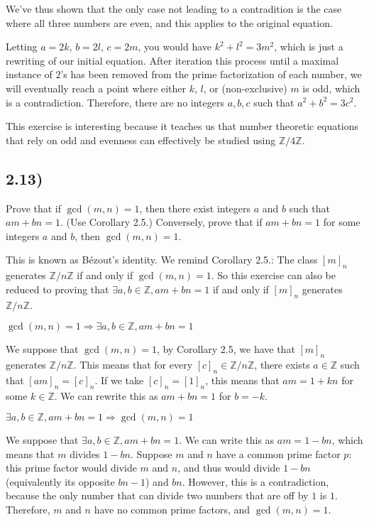 We've thus shown that the only case not leading to a contradition is the case where all three numbers are even, and this applies to the original equation.

Letting $a = 2k$, $b = 2l$, $c = 2m$, you would have $k^2 + l^2 = 3m^2$, which is just a rewriting of our initial equation. After iteration this process until a maximal instance of $2$'s has been removed from the prime factorization of each number, we will eventually reach a point where either $k$, $l$, or (non-exclusive) $m$ is odd, which is a contradiction. Therefore, there are no integers $a, b, c$ such that $a^2 + b^2 = 3c^2$.

This exercise is interesting because it teaches us that number theoretic equations that rely on odd and evenness can effectively be studied using $\mathbb{Z}/4\mathbb{Z}$.


\subsection*{2.13)}

Prove that if $\gcd(m, n) = 1$, then there exist integers $a$ and $b$ such that $am + bn = 1$. (Use Corollary 2.5.) Conversely, prove that if $am + bn = 1$ for some integers $a$ and $b$, then $\gcd(m, n) = 1$.

This is known as Bézout's identity. We remind Corollary 2.5.: The class $[m]_n$ generates $\mathbb{Z}/n\mathbb{Z}$ if and only if $\gcd(m, n) = 1$. So this exercise can also be reduced to proving that $\exists a, b \in \mathbb{Z}, am + bn = 1$ if and only if $[m]_n$ generates $\mathbb{Z}/n\mathbb{Z}$.

\textbf{$\gcd(m, n) = 1 \Rightarrow \exists a, b \in \mathbb{Z}, am + bn = 1$}

We suppose that $\gcd(m,n) = 1$, by Corollary 2.5, we have that $[m]_n$ generates $\mathbb{Z}/n\mathbb{Z}$. This means that for every $[c]_n \in \mathbb{Z}/n\mathbb{Z}$, there exists $a \in \mathbb{Z}$ such that $[am]_n = [c]_n$. If we take $[c]_n = [1]_n$, this means that $am = 1 + kn$ for some $k \in \mathbb{Z}$. We can rewrite this as $am + bn = 1$ for $b = -k$.

\textbf{$\exists a, b \in \mathbb{Z}, am + bn = 1 \Rightarrow \gcd(m, n) = 1$}

We suppose that $\exists a, b \in \mathbb{Z}, am + bn = 1$. We can write this as $am = 1 - bn$, which means that $m$ divides $1 - bn$. Suppose $m$ and $n$ have a common prime factor $p$: this prime factor would divide $m$ and $n$, and thus would divide $1 - bn$ (equivalently its opposite $bn - 1$) and $bn$. However, this is a contradiction, because the only number that can divide two numbers that are off by $1$ is $1$. Therefore, $m$ and $n$ have no common prime factors, and $\gcd(m, n) = 1$.


